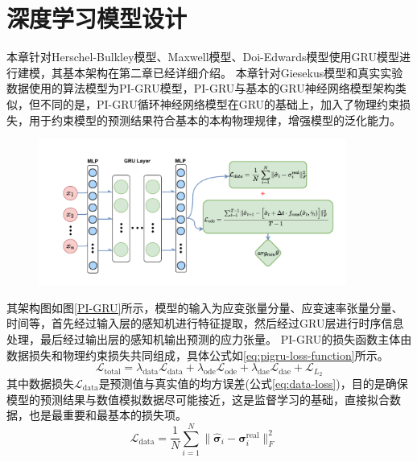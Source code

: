 \section{深度学习模型设计}
本章针对Herschel-Bulkley模型、Maxwell模型、Doi-Edwards模型使用GRU模型进行建模，其基本架构在第二章已经详细介绍。
本章针对Giesekus模型和真实实验数据使用的算法模型为PI-GRU模型，PI-GRU与基本的GRU神经网络模型架构类似，但不同的是，PI-GRU循环神经网络模型在GRU的基础上，加入了物理约束损失，用于约束模型的预测结果符合基本的本构物理规律，增强模型的泛化能力。
\begin{figure}
  \centering
  \includegraphics[width=0.9\textwidth]{Fig/PI-GRU.pdf}
\end{figure}
其架构图如图\ref{PI-GRU}所示，模型的输入为应变张量分量、应变速率张量分量、时间等，首先经过输入层的感知机进行特征提取，然后经过GRU层进行时序信息处理，最后经过输出层的感知机输出预测的应力张量。
PI-GRU的损失函数主体由数据损失和物理约束损失共同组成，具体公式如\ref{eq:pigru-loss-function}所示。
\begin{equation}
  \mathcal{L}_{\text{total}} =
  \lambda_{\text{data}} \mathcal{L}_{\text{data}} +
  \lambda_{\text{ode}} \mathcal{L}_{\text{ode}} +
  \lambda_{\text{dae}} \mathcal{L}_{\text{dae}}+
  \mathcal{L}_{L_{2}} \label{eq:pigru-loss-function}
\end{equation}
其中数据损失$\mathcal{L}_{\text{data}}$是预测值与真实值的均方误差(公式\ref{eq:data-loss})，目的是确保模型的预测结果与数值模拟数据尽可能接近，这是监督学习的基础，直接拟合数据，也是最重要和最基本的损失项。
\begin{equation}
  \mathcal{L}_{\text{data}} = \frac{1}{N} \sum_{i=1}^N
  \|\hat{\bm{\sigma}}_i - \bm{\sigma}_i^{\text{real}}\|_F^2
  \quad \label{eq:data-loss}
\end{equation}

